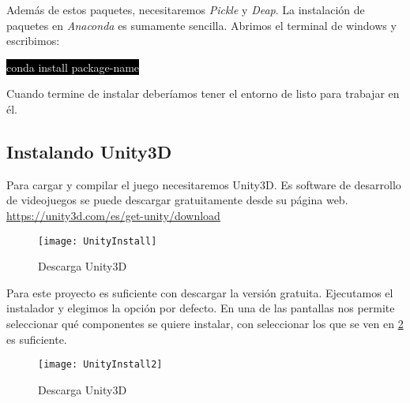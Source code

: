 Además de estos paquetes, necesitaremos \emph{Pickle} y \emph{Deap}. La instalación de paquetes en \emph{Anaconda} es sumamente sencilla. Abrimos el terminal de windows y escribimos:

\colorbox{black}{\textcolor{white}{conda install package-name}}


Cuando termine de instalar deberíamos tener el entorno de  listo para trabajar en él.

\subsection{Instalando Unity3D}

Para cargar y compilar el juego necesitaremos Unity3D. Es software de desarrollo de videojuegos se puede descargar gratuitamente desde su página web. \url{https://unity3d.com/es/get-unity/download}

\begin{figure}[h!]
    \centering
    \texttt{[image: UnityInstall]}
    \caption{Descarga Unity3D}
    \label{fig:Unity}
\end{figure}

Para este proyecto es suficiente con descargar la versión gratuita. Ejecutamos el instalador y elegimos la opción por defecto. En una de las pantallas nos permite seleccionar qué componentes se quiere instalar, con seleccionar los que se ven en \ref{fig:Unity2} es suficiente.

\begin{figure}[h!]
    \centering
    \texttt{[image: UnityInstall2]}
    \caption{Descarga Unity3D}
    \label{fig:Unity2}
\end{figure}


